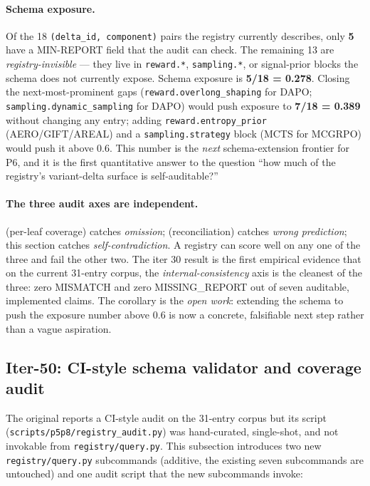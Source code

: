 \paragraph{Schema exposure.} Of the 18
\texttt{(delta\_id, component)} pairs the registry currently
describes, only \textbf{5} have a MIN-REPORT field that the audit
can check. The remaining 13 are \emph{registry-invisible} --- they
live in \texttt{reward.*}, \texttt{sampling.*}, or signal-prior
blocks the schema does not currently expose. Schema exposure is
\textbf{5/18 = 0.278}. Closing the next-most-prominent gaps
(\texttt{reward.overlong\_shaping} for DAPO;
\texttt{sampling.dynamic\_sampling} for DAPO) would push exposure to
\textbf{7/18 = 0.389} without changing any entry; adding
\texttt{reward.entropy\_prior} (AERO/GIFT/AREAL) and a
\texttt{sampling.strategy} block (MCTS for MCGRPO) would push it
above 0.6. This number is the \emph{next} schema-extension
frontier for P6, and it is the first quantitative answer to the
question ``how much of the registry's variant-delta surface is
self-auditable?''

\paragraph{The three audit axes are independent.}
 (per-leaf coverage) catches \emph{omission};
 (reconciliation) catches
\emph{wrong prediction}; this section catches \emph{self-contradiction}.
A registry can score well on any one of the three and fail the
other two. The iter 30 result is the first empirical evidence that
on the current 31-entry corpus, the \emph{internal-consistency} axis
is the cleanest of the three: zero MISMATCH and zero MISSING\_REPORT
out of seven auditable, implemented claims. The corollary is the
\emph{open work}: extending the schema to push the exposure number
above 0.6 is now a concrete, falsifiable next step rather than a
vague aspiration.
\subsection{Iter-50: CI-style schema validator and coverage audit}
\label{sec:p6-registry-health-iter50}

The original  reports a CI-style audit on the
31-entry corpus but its script (\texttt{scripts/p5p8/registry\_audit.py})
was hand-curated, single-shot, and not invokable from
\texttt{registry/query.py}. This subsection introduces two new
\texttt{registry/query.py} subcommands (additive, the existing seven
subcommands are untouched) and one audit script that the new
subcommands invoke:

